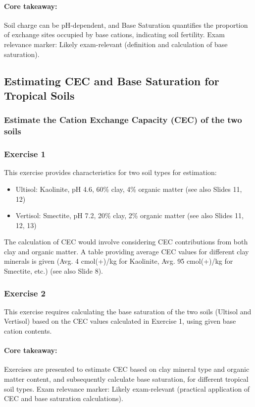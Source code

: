 \paragraph*{Core takeaway:} 
Soil charge can be pH-dependent, and Base Saturation quantifies the proportion of exchange sites occupied by base cations, indicating soil fertility. Exam relevance marker: Likely exam-relevant (definition and calculation of base saturation).

\subsection{Estimating CEC and Base Saturation for Tropical Soils} 
\subsubsection{Estimate the Cation Exchange Capacity (CEC) of the two soils} 
\subsubsection{Exercise 1} 
This exercise provides characteristics for two soil types for estimation: 
\begin{itemize} 
    \item Ultisol: Kaolinite, pH 4.6, 60\% clay, 4\% organic matter (see also Slides 11, 12) 
    \item Vertisol: Smectite, pH 7.2, 20\% clay, 2\% organic matter (see also Slides 11, 12, 13) 
\end{itemize} 

The calculation of CEC would involve considering CEC contributions from both clay and organic matter. A table providing average CEC values for different clay minerals is given (Avg. 4 cmol(+)/kg for Kaolinite, Avg. 95 cmol(+)/kg for Smectite, etc.) (see also Slide 8).

\subsubsection{Exercise 2} 
This exercise requires calculating the base saturation of the two soils (Ultisol and Vertisol) based on the CEC values calculated in Exercise 1, using given base cation contents.

\paragraph*{Core takeaway:} 
Exercises are presented to estimate CEC based on clay mineral type and organic matter content, and subsequently calculate base saturation, for different tropical soil types. Exam relevance marker: Likely exam-relevant (practical application of CEC and base saturation calculations).

